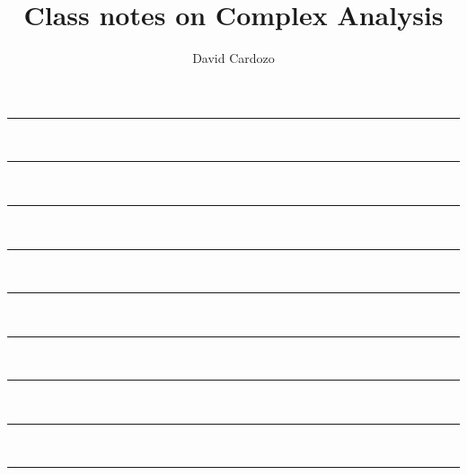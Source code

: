 \documentclass[notitlepage]{article}
\author{David Cardozo}
\title{Class notes on Complex Analysis}
\begin{document}



\noindent\rule{\textwidth}{1pt}\\[-0.1cm]


\noindent\rule{\textwidth}{1pt}\\[-0.1cm]


\noindent\rule{\textwidth}{1pt}\\[-0.1cm]
	

\noindent\rule{\textwidth}{1pt}\\[-0.1cm]



\noindent\rule{\textwidth}{1pt}\\[-0.1cm]



\noindent\rule{\textwidth}{1pt}\\[-0.1cm]


	
\noindent\rule{\textwidth}{1pt}\\[-0.1cm]




\noindent\rule{\textwidth}{1pt}\\[-0.1cm]



\noindent\rule{\textwidth}{1pt}\\[-0.1cm]
\end{document}

